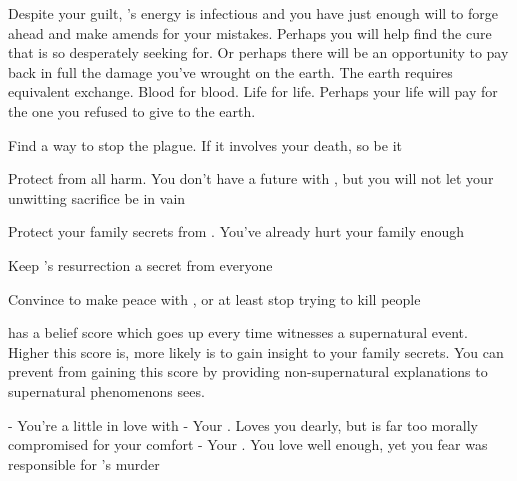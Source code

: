\documentclass[char]{Pestilence}
\begin{document}
Despite your guilt, \cOutsider{}'s energy is infectious and you have just enough will to forge ahead and make amends for your mistakes. Perhaps you will help find the cure that \cOutsider{} is so desperately seeking for. Or perhaps there will be an opportunity to pay back in full the damage you've wrought on the earth. The earth requires equivalent exchange. Blood for blood. Life for life. Perhaps your life will pay for the one you refused to give to the earth.  

\begin{itemz}[Goals]
	\item Find a way to stop the plague. If it involves your death, so be it
	\item Protect \cOutsider{} from all harm. You don't have a future with \cOutsider{\them}, but you will not let your unwitting sacrifice be in vain
	\item Protect your family secrets from \cOutsider{}. You've already hurt your family enough
	\item Keep \cOutsider{}'s resurrection a secret from everyone
	\item Convince \cApprentice{} to make peace with \cOutsider{}, or at least stop trying to kill people
\end{itemz}

\begin{itemz}[Notes]
	\item \cOutsider{} has a belief score which goes up every time \cOutsider{\they} witnesses a supernatural event. Higher this score is, more likely \cOutsider{\they} is to gain insight to your family secrets. You can prevent \cOutsider{\them} from gaining this score by providing non-supernatural explanations to supernatural phenomenons \cOutsider{\they} sees. 
\end{itemz}

\begin{contacts}
	\contact{\cOutsider{}} - You're a little in love with \cOutsider{\them}
	\contact{\cElder{}} - Your \cElder{\parent}. Loves you dearly, but is far too morally compromised for your comfort
	\contact{\cApprentice{}} - Your \cApprentice{\sibling}. You love \cApprentice{\them} well enough, yet you fear \cApprentice{\they} was responsible for \cOutsider{}'s murder

\end{contacts}
\end{document}
